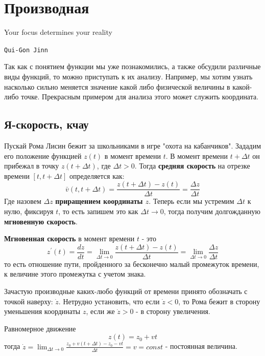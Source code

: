 \section{Производная}
\epigraph{\textsf{Your focus determines your reality}}{\texttt{Qui-Gon Jinn}}
Так как с понятием функции мы уже познакомились, а также обсудили различные виды функций, то можно приступать к их анализу. Например, мы хотим узнать насколько сильно меняется значение какой либо физической величины в какой-либо точке. Прекрасным примером для анализа этого может служить координата.
\subsection{Я-скорость, кчау}
Пускай Рома Лисин бежит за школьниками в игре "охота на кабанчиков". Зададим его положение функцией $z(t)$ в момент времени $t$. В момент времени $t + \Delta t$ он прибежал в точку $z(t + \Delta t)$, где $\Delta t > 0$.
Тогда \textbf{средняя скорость} на отрезке времени $[t, t + \Delta t]$ определяется как:
\begin{equation*}
    \bar{v} (t, t + \Delta t) = \frac{z(t + \Delta t) - z(t)}{\Delta t} = \frac{\Delta z}{\Delta t}
\end{equation*}
Где назовем $\Delta z$ \textbf{приращением координаты $z$}. Теперь если мы устремим $\Delta t$ к нулю, фиксируя $t$, то есть запишем это как $\Delta t \rightarrow 0$, тогда получим долгожданную \textbf{мгновенную скорость}.
\begin{definition}
    \textbf{Мгновенная скорость} в момент времени $t$ - это 
    \begin{equation*}
        z^{'}(t) = \frac{dz}{dt} = \lim_{\Delta t \rightarrow 0} \frac{z(t + \Delta t) - z(t)}{\Delta t} = \lim_{\Delta t \rightarrow 0} \frac{\Delta z}{\Delta t}
    \end{equation*}
    то есть отношение пути, пройденного за бесконечно малый промежуток времени, к величине этого промежутка с учетом знака.
\end{definition}
Зачастую производные каких-любо функций от времени принято обозначать с точкой наверху: $\dot{z}$. Нетрудно установить, что если $\dot{z} < 0$, то Рома бежит в сторону уменьшения координаты $z$, если же $\dot z > 0$ - в сторону увеличения.

\begin{example}
    Равномерное движение
    \begin{equation*}
        z(t) = z_0 + vt
    \end{equation*}
    тогда $\displaystyle\dot{z} = \lim_{\Delta t \rightarrow 0} \frac{z_0 + v(t + \Delta t) - z_0 - vt}{\Delta t} = v = const$ - постоянная величина.
\end{example}

